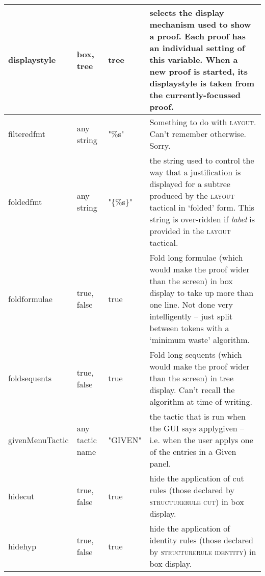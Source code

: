 \begin{longtable}{|l|p{2cm}|l|p{2.5in}|}
{\raggedright displaystyle} & {\raggedright box, tree} & {\raggedright tree} & {\raggedright selects the display mechanism used to show a proof. Each proof has an individual setting of this variable. When a new proof is started, its displaystyle is taken from the currently-focussed proof.}\\
\hline

filteredfmt & any string & "\%s" & Something to do with \textsc{layout}. Can't remember otherwise. Sorry.\\ \hline

{\raggedright foldedfmt} & {\raggedright any string} & {\raggedright "\{\%s\}"} & {\raggedright the string used to control the way that a justification is displayed for a subtree produced by the \textsc{layout} tactical in `folded' form. This string is over-ridden if \textit{label} is provided in the \textsc{layout} tactical.}\\
\hline

foldformulae & true, false & true & Fold long formulae (which would make the proof wider than the screen) in box display to take up more than one line. Not done very intelligently -- just split between tokens with a `minimum waste' algorithm.\\ \hline

foldsequents & true, false & true & Fold long sequents (which would make the proof wider than the screen) in tree display. Can't recall the algorithm at time of writing.\\ \hline


givenMenuTactic & any tactic name & "GIVEN" & the tactic that is run when the GUI says applygiven -- i.e. when the user applys one of the entries in a Given panel.\\ \hline

{\raggedright hidecut} & {\raggedright true, false} & {\raggedright true} & {\raggedright hide the application of cut rules (those declared by \textsc{structurerule cut}) in box display.}\\
\hline

{\raggedright hidehyp} & {\raggedright true, false} & {\raggedright true} & hide the application of identity rules (those declared by \textsc{structurerule identity}) in box display.\\
\hline


\end{longtable}
